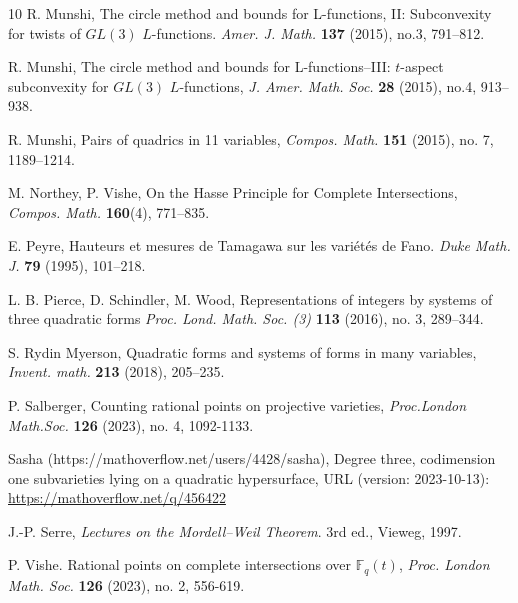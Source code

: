 \documentclass[letterpaper,11pt]{amsart}
\numberwithin{equation}{section}
\theoremstyle{definition}
\numberwithin{equation}{section}
\newcommand{\FF}{\mathbb{F}}
\begin{document}
\begin{thebibliography}{10}
 R. Munshi, The circle method and bounds for L-functions, II: Subconvexity for twists of $GL(3)$ $L$-functions.
{\em Amer. J. Math.} \textbf{137} (2015), no.3, 791--812.

	 R. Munshi, 
The circle method and bounds for L-functions--III: $t$-aspect subconvexity for $GL(3)$ $L$-functions, {\em J. Amer. Math. Soc.} \textbf{28} (2015), no.4, 913--938.

 R. Munshi, Pairs of quadrics in 11 variables, \emph{Compos. Math.} \textbf{151} (2015), no. 7, 1189--1214.

  M. Northey, P. Vishe, On the Hasse Principle for Complete Intersections, {\em Compos. Math.} \textbf{160}(4), 771--835.

 E. Peyre, Hauteurs et mesures de Tamagawa sur les vari\'et\'es de Fano. {\em Duke Math. J.} \textbf{79} (1995), 101--218.

L. B. Pierce, D. Schindler, M. Wood, Representations of integers by systems of three quadratic forms
{\em Proc. Lond. Math. Soc. (3)} \textbf{113} (2016), no. 3, 289--344.

 S. Rydin Myerson, Quadratic forms and systems of forms in many variables, {\em Invent. math.} \textbf{213} (2018), 205--235.


 P. Salberger, Counting rational points on projective varieties, {\em Proc.\@ London Math.\@ Soc.} \textbf{126} (2023), no. 4, 1092-1133.

Sasha (https://mathoverflow.net/users/4428/sasha), Degree three, codimension one subvarieties lying on a quadratic hypersurface, URL (version: 2023-10-13): \url{https://mathoverflow.net/q/456422}

J.-P. Serre,
{\em Lectures on the Mordell--Weil Theorem}. 3rd ed., Vieweg, 1997.


 P. Vishe. Rational points on complete intersections over $\FF_q(t)$, {\em Proc. London Math. Soc.} \textbf{126} (2023), no. 2, 556-619.
\end{thebibliography}
\end{document}
